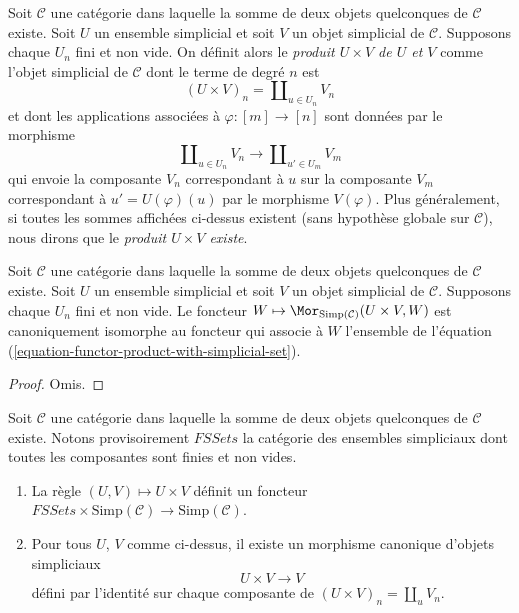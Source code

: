 \begin{definition}
\label{definition-product-with-simplicial-set}
Soit $\mathcal{C}$ une catégorie dans laquelle la somme de deux objets
quelconques de $\mathcal{C}$ existe. Soit $U$ un ensemble simplicial et soit $V$ un objet
simplicial de $\mathcal{C}$. Supposons chaque $U_n$ fini et non vide.
On définit alors le {\it produit $U \times V$ de $U$ et $V$} comme
l'objet simplicial de $\mathcal{C}$ dont le terme de degré $n$ est
$$
(U \times V)_n = \coprod\nolimits_{u\in U_n} V_n
$$
et dont les applications associées à $\varphi : [m] \to [n]$ sont données
par le morphisme
$$
\coprod\nolimits_{u\in U_n} V_n
\longrightarrow
\coprod\nolimits_{u'\in U_m} V_m
$$
qui envoie la composante $V_n$ correspondant à $u$ sur la composante
$V_m$ correspondant à $u' = U(\varphi)(u)$ par le morphisme
$V(\varphi)$.
Plus généralement, si toutes les sommes affichées ci-dessus existent
(sans hypothèse globale sur $\mathcal{C}$), nous dirons que le
{\it produit $U \times V$ existe}.
\end{definition}

\begin{lemma}
\label{lemma-check-product-with-simplicial-set}
Soit $\mathcal{C}$ une catégorie dans laquelle la somme de deux objets
quelconques de $\mathcal{C}$ existe. Soit $U$ un ensemble simplicial et soit $V$ un objet
simplicial de $\mathcal{C}$. Supposons chaque $U_n$ fini et non vide.
Le foncteur
$W \mapsto \Mor_{\text{Simp}(\mathcal{C})}(U \times V, W)$
est canoniquement isomorphe au foncteur qui associe à $W$ l'ensemble de
l'équation (\ref{equation-functor-product-with-simplicial-set}).
\end{lemma}

\begin{proof}
Omis.
\end{proof}

\begin{lemma}
\label{lemma-back-to-U}
Soit $\mathcal{C}$ une catégorie dans laquelle la somme de deux objets
quelconques de $\mathcal{C}$ existe. Notons provisoirement $\textit{FSSets}$ la catégorie
des ensembles simpliciaux dont toutes les composantes sont finies et non
vides.
\begin{enumerate}
\item La règle $(U, V) \mapsto U \times V$ définit un foncteur
$\textit{FSSets} \times \text{Simp}(\mathcal{C})
\to \text{Simp}(\mathcal{C})$.
\item Pour tous $U$, $V$ comme ci-dessus, il existe un morphisme canonique
d'objets simpliciaux
$$
U \times V \longrightarrow V
$$
défini par l'identité sur chaque composante de
$(U \times V)_n = \coprod_u V_n$.
\end{enumerate}
\end{lemma}

